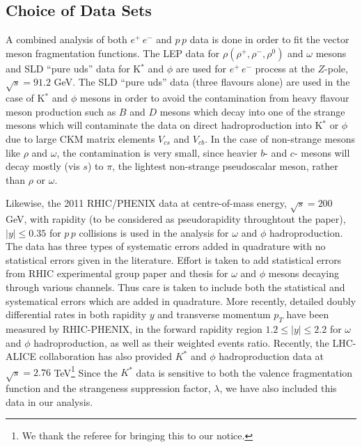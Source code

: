 \documentclass{ws-ijmpa}
\def\om{{\omega}}
\def\ph{{\phi}}
\begin{document}
\subsection{Choice of Data Sets}
\label{Choice}
A combined analysis of both $e^+\,e^-$ and $p\,p$ data is done in
order to fit the vector meson fragmentation functions.  The LEP
data\cite{Data,Rho1,Rho2,Rho3,Rho5,Omega1,Omega2} for
$\rho(\rho^+, \rho^-, \rho^0)$ and $\omega$
mesons and SLD ``pure uds'' data\cite{SLD1,SLD2} for K$^*$ and $\phi$ are used
for $e^+\,e^-$ process at the $Z$-pole, $\sqrt s = 91.2$ GeV. The SLD
``pure uds'' data (three flavours alone) are used in the case of K$^*$
and $\phi$ mesons in order to avoid the contamination from heavy flavour
meson production such as $B$ and $D$ mesons which decay into one of the
strange mesons which will contaminate the data on direct hadroproduction
into K$^*$ or $\phi$ due to large CKM matrix elements $V_{cs}$ and
$V_{cb}$. In the case of non-strange mesons like $\rho$ and $\omega$,
the contamination is very small, since heavier $b$- and $c$- mesons will
decay mostly (vis $s$) to $\pi$, the lightest non-strange pseudoscalar
meson, rather than $\rho$ or $\omega$.

Likewise, the 2011 RHIC/PHENIX data\cite{RHIC} at centre-of-mass energy,
$\sqrt{s} = 200$ GeV, with rapidity (to be considered as pseudorapidity
throughtout the paper), $|y|\le 0.35$ for
$p\,p$ collisions is used in the analysis for $\om$ and $\ph$ hadroproduction.
The data has three types of systematic errors added in quadrature
with no statistical errors given in the literature. Effort is taken to
add statistical errors from RHIC experimental group paper\cite{RHIC} and
thesis\cite{Deepali} for $\om$ and $\phi$ mesons decaying through various
channels. Thus care is taken to include both the statistical and systematical
errors which are added in quadrature. More recently\cite{Ratio},
detailed doubly differential rates in both rapidity $y$ and transverse
momentum $p_T$ have been measured by RHIC-PHENIX, in the forward
rapidity region $1.2 \le \vert y \vert \le 2.2$ for $\omega$ and $\phi$
hadroproduction, as well as their weighted events ratio. Recently, the
LHC-ALICE collaboration\cite{LHC-17} has also provided $K^*$ and $\phi$
hadroproduction data at $\sqrt{s} = 2.76$ TeV\footnote{We thank the
referee for bringing this to our notice.} Since the $K^*$ data is
sensitive to both the valence fragmentation function and the strangeness
suppression factor, $\lambda$, we have also included this data in our
analysis. 
\end{document}
